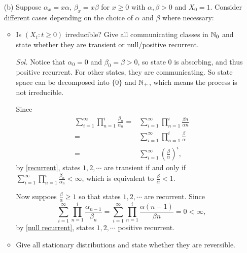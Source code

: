 \begin{enumerate}
    \item[(b)] Suppose $\alpha_x = x \alpha$, $\beta_x = x \beta$ for $x \ge 0$ with $\alpha,\beta > 0$ and $X_0 = 1$. Consider different cases depending on the choice of $\alpha$ and $\beta$ where necessary: 
    \begin{itemize}
        \item Is $(X_t: t \ge 0)$ irreducible? Give all communicating classes in $\mathbb{N}_0$ and state whether they are transient or null/positive recurrent.
        
        \textit{ Sol. } Notice that $\alpha_0 = 0$ and $\beta_0 = \beta > 0$, so state $0$ is absorbing, and thus positive recurrent. For other states, they are communicating. So state space can be decomposed into $\{0\}$ and $\mathbb{N}_+$, which means the process is not irreducible.

        Since
        \begin{align*}
            \sum_{i=1}^\infty \prod_{n=1}^i \frac{\beta_n}{\alpha_n} = & \sum_{i=1}^\infty \prod_{n=1}^i \frac{\beta n}{\alpha n} \\
            = & \sum_{i=1}^\infty \prod_{n=1}^i \frac{\beta}{\alpha} \\ 
            = & \sum_{i=1}^\infty \left( \frac{\beta}{\alpha} \right)^i,
        \end{align*}
        by \eqref{recurrent}, states $1, 2, \cdots$ are transient if and only if $\sum_{i=1}^\infty \prod_{n=1}^i \frac{\beta_n}{\alpha_n} < \infty$, which is equivalent to $\frac{\beta}{\alpha} < 1$. 

        Now suppoes $\frac{\beta}{\alpha} \ge 1$ so that states $1, 2, \cdots$ are  recurrent. 
        Since 
        \begin{equation*}
            \sum_{i=1}^\infty \prod_{n=1}^i \frac{\alpha_{n-1}}{\beta_n} = \sum_{i=1}^\infty \prod_{n=1}^i \frac{\alpha(n-1)}{\beta n} = 0 < \infty,
        \end{equation*}
        by \eqref{null recurrent}, states $1, 2, \cdots$ positive recurrent. 

        \item Give all stationary distributions and state whether they are reversible.
        

\end{itemize}
\end{enumerate}
